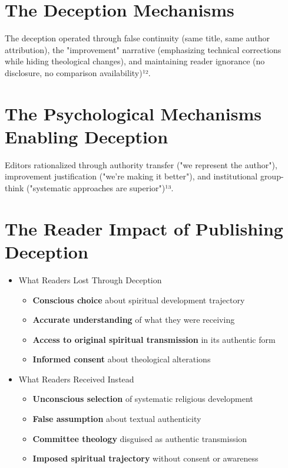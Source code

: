 \documentclass[11pt,twoside]{book}
\begin{document}
\section*{The Deception Mechanisms}
\label{sec:orgf8ec204}

The deception operated through false continuity (same title, same author attribution), the "improvement" narrative (emphasizing technical corrections while hiding theological changes), and maintaining reader ignorance (no disclosure, no comparison availability)¹².
\section*{The Psychological Mechanisms Enabling Deception}
\label{sec:org78b9de0}

Editors rationalized through authority transfer ("we represent the author"), improvement justification ("we're making it better"), and institutional group-think ("systematic approaches are superior")¹³.
\section*{The Reader Impact of Publishing Deception}
\label{sec:org33fd54b}

\begin{itemize}
\item What Readers Lost Through Deception
\label{sec:org66bf262}
\begin{itemize}
\item \textbf{\textbf{Conscious choice}} about spiritual development trajectory
\item \textbf{\textbf{Accurate understanding}} of what they were receiving
\item \textbf{\textbf{Access to original spiritual transmission}} in its authentic form
\item \textbf{\textbf{Informed consent}} about theological alterations
\end{itemize}
\item What Readers Received Instead
\label{sec:org5e01ca3}
\begin{itemize}
\item \textbf{\textbf{Unconscious selection}} of systematic religious development
\item \textbf{\textbf{False assumption}} about textual authenticity
\item \textbf{\textbf{Committee theology}} disguised as authentic transmission
\item \textbf{\textbf{Imposed spiritual trajectory}} without consent or awareness
\end{itemize}
\end{itemize}
\end{document}
